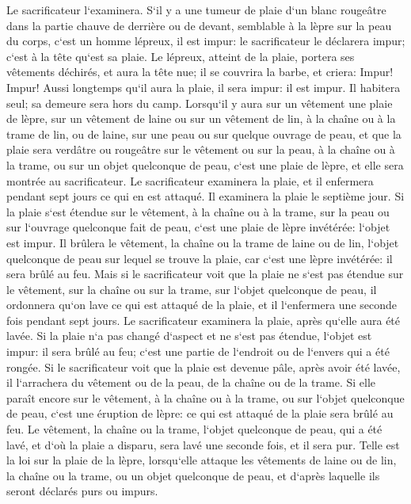 \verse Le sacrificateur l`examinera. S`il y a une tumeur de plaie d`un blanc rougeâtre dans la partie chauve de derrière ou de devant, semblable à la lèpre sur la peau du corps, 
\verse c`est un homme lépreux, il est impur: le sacrificateur le déclarera impur; c`est à la tête qu`est sa plaie. 
\verse Le lépreux, atteint de la plaie, portera ses vêtements déchirés, et aura la tête nue; il se couvrira la barbe, et criera: Impur! Impur! 
\verse Aussi longtemps qu`il aura la plaie, il sera impur: il est impur. Il habitera seul; sa demeure sera hors du camp. 
\verse Lorsqu`il y aura sur un vêtement une plaie de lèpre, sur un vêtement de laine ou sur un vêtement de lin, 
\verse à la chaîne ou à la trame de lin, ou de laine, sur une peau ou sur quelque ouvrage de peau, 
\verse et que la plaie sera verdâtre ou rougeâtre sur le vêtement ou sur la peau, à la chaîne ou à la trame, ou sur un objet quelconque de peau, c`est une plaie de lèpre, et elle sera montrée au sacrificateur. 
\verse Le sacrificateur examinera la plaie, et il enfermera pendant sept jours ce qui en est attaqué. 
\verse Il examinera la plaie le septième jour. Si la plaie s`est étendue sur le vêtement, à la chaîne ou à la trame, sur la peau ou sur l`ouvrage quelconque fait de peau, c`est une plaie de lèpre invétérée: l`objet est impur. 
\verse Il brûlera le vêtement, la chaîne ou la trame de laine ou de lin, l`objet quelconque de peau sur lequel se trouve la plaie, car c`est une lèpre invétérée: il sera brûlé au feu. 
\verse Mais si le sacrificateur voit que la plaie ne s`est pas étendue sur le vêtement, sur la chaîne ou sur la trame, sur l`objet quelconque de peau, 
\verse il ordonnera qu`on lave ce qui est attaqué de la plaie, et il l`enfermera une seconde fois pendant sept jours. 
\verse Le sacrificateur examinera la plaie, après qu`elle aura été lavée. Si la plaie n`a pas changé d`aspect et ne s`est pas étendue, l`objet est impur: il sera brûlé au feu; c`est une partie de l`endroit ou de l`envers qui a été rongée. 
\verse Si le sacrificateur voit que la plaie est devenue pâle, après avoir été lavée, il l`arrachera du vêtement ou de la peau, de la chaîne ou de la trame. 
\verse Si elle paraît encore sur le vêtement, à la chaîne ou à la trame, ou sur l`objet quelconque de peau, c`est une éruption de lèpre: ce qui est attaqué de la plaie sera brûlé au feu. 
\verse Le vêtement, la chaîne ou la trame, l`objet quelconque de peau, qui a été lavé, et d`où la plaie a disparu, sera lavé une seconde fois, et il sera pur. 
\verse Telle est la loi sur la plaie de la lèpre, lorsqu`elle attaque les vêtements de laine ou de lin, la chaîne ou la trame, ou un objet quelconque de peau, et d`après laquelle ils seront déclarés purs ou impurs. 

